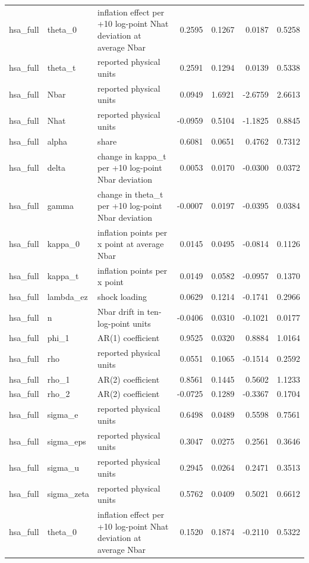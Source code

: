 \begin{tabular}{lllrrrr}
hsa\_full & theta\_0 & inflation effect per +10 log-point Nhat deviation at average Nbar & 0.2595 & 0.1267 & 0.0187 & 0.5258 \\
hsa\_full & theta\_t & reported physical units & 0.2591 & 0.1294 & 0.0139 & 0.5338 \\
hsa\_full & Nbar & reported physical units & 0.0949 & 1.6921 & -2.6759 & 2.6613 \\
hsa\_full & Nhat & reported physical units & -0.0959 & 0.5104 & -1.1825 & 0.8845 \\
hsa\_full & alpha & share & 0.6081 & 0.0651 & 0.4762 & 0.7312 \\
hsa\_full & delta & change in kappa\_t per +10 log-point Nbar deviation & 0.0053 & 0.0170 & -0.0300 & 0.0372 \\
hsa\_full & gamma & change in theta\_t per +10 log-point Nbar deviation & -0.0007 & 0.0197 & -0.0395 & 0.0384 \\
hsa\_full & kappa\_0 & inflation points per x point at average Nbar & 0.0145 & 0.0495 & -0.0814 & 0.1126 \\
hsa\_full & kappa\_t & inflation points per x point & 0.0149 & 0.0582 & -0.0957 & 0.1370 \\
hsa\_full & lambda\_ez & shock loading & 0.0629 & 0.1214 & -0.1741 & 0.2966 \\
hsa\_full & n & Nbar drift in ten-log-point units & -0.0406 & 0.0310 & -0.1021 & 0.0177 \\
hsa\_full & phi\_1 & AR(1) coefficient & 0.9525 & 0.0320 & 0.8884 & 1.0164 \\
hsa\_full & rho & reported physical units & 0.0551 & 0.1065 & -0.1514 & 0.2592 \\
hsa\_full & rho\_1 & AR(2) coefficient & 0.8561 & 0.1445 & 0.5602 & 1.1233 \\
hsa\_full & rho\_2 & AR(2) coefficient & -0.0725 & 0.1289 & -0.3367 & 0.1704 \\
hsa\_full & sigma\_e & reported physical units & 0.6498 & 0.0489 & 0.5598 & 0.7561 \\
hsa\_full & sigma\_eps & reported physical units & 0.3047 & 0.0275 & 0.2561 & 0.3646 \\
hsa\_full & sigma\_u & reported physical units & 0.2945 & 0.0264 & 0.2471 & 0.3513 \\
hsa\_full & sigma\_zeta & reported physical units & 0.5762 & 0.0409 & 0.5021 & 0.6612 \\
hsa\_full & theta\_0 & inflation effect per +10 log-point Nhat deviation at average Nbar & 0.1520 & 0.1874 & -0.2110 & 0.5322 \\

\end{tabular}
